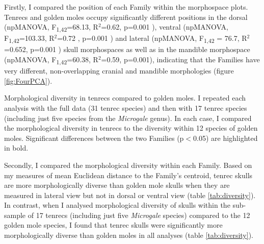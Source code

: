 	Firstly, I compared the position of each Family within the morphospace plots. Tenrecs and golden moles occupy significantly different positions in the dorsal (npMANOVA, F\textsubscript{1,42}=68.13, R$^2$=0.62, p=0.001 ), ventral (npMANOVA, F\textsubscript{1,42}=103.33, R$^2$=0.72 , p=0.001 ) and lateral (npMANOVA, F\textsubscript{1,42} = 76.7, R$^2$ =0.652, p=0.001 ) skull morphospaces as well as in the mandible morphospace (npMANOVA, F\textsubscript{1,42}=60.38, R$^2$=0.59, p=0.001),  indicating that the Families have very different, non-overlapping cranial and mandible morphologies (figure \ref{fig:FourPCA}). 

	
	
	\begin{table}[!htbp]			
		\caption[Comparison of morphological diversity in tenrecs and golden moles.]
		{Morphological diversity in tenrecs compared to golden moles. I repeated each analysis with the full data (31 tenrec species) and then with 17 tenrec species (including just five species from the \textit{Microgale} genus). In each case, I compared the morphological diversity in tenrecs to the diversity within 12 species of golden moles. Significant differences between the two Families (p$<$0.05) are highlighted in bold.}
		 
		\label{tab:diversity}  
	\end{table}


	Secondly, I compared the morphological diversity within each Family. Based on my measures of mean Euclidean distance to the Family's centroid, tenrec skulls are more morphologically diverse than golden mole skulls when they are measured in lateral view but not in dorsal or ventral view (table \ref{tab:diversity}). In contrast, when I analysed morphological diversity of skulls within the sub-sample of 17 tenrecs (including just five \textit{Microgale} species) compared to the 12 golden mole species, I found that tenrec skulls were significantly more morphologically diverse than golden moles in all analyses (table \ref{tab:diversity}).
		
